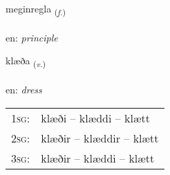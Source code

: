 \documentclass[frontgrid, backgrid]{flacards}\usepackage[]{graphicx}\usepackage[]{color}
\begin{document}
\renewcommand{\flhead}{\vskip5pt \fboxsep=0pt {\small\bfseries\footnotesize Nafnorð | Noun}}
\renewcommand{\fcfoot}{\vskip5pt \fboxsep=0pt \hspace{2pt}{\small\bfseries\footnotesize 2K}}

\renewcommand{\blhead}{\vskip5pt {\small\bfseries\footnotesize Nafnorð | Noun }}
\renewcommand{\bcfoot}{\vskip5pt \hspace{2pt}{\small\bfseries\footnotesize 2K}}


{meginregla \small{\textsubscript{(\textit{f.})}} \\[1ex] %
\textphonetic{[meijɪnrɛkla]} \\
en: \emph{principle} \\  [2ex]
\renewcommand*{\arraystretch}{0.8}
}

\renewcommand{\flhead}{\vskip5pt \fboxsep=0pt {\small\bfseries\footnotesize Sagnorð | Verb}}
\renewcommand{\fcfoot}{\vskip5pt \fboxsep=0pt \hspace{2pt}{\small\bfseries\footnotesize 2K}}

\renewcommand{\blhead}{\vskip5pt {\small\bfseries\footnotesize Sagnorð | Verb }}
\renewcommand{\bcfoot}{\vskip5pt \hspace{2pt}{\small\bfseries\footnotesize 2K}}


{klæða \small{\textsubscript{(\textit{v.})}} \\[1ex] %
\textphonetic{[kʰlaiːða]} \\
en: \emph{dress} \\  [2ex]
\renewcommand*{\arraystretch}{0.8}
\begin{tabular}{p{1cm}l}
\textsc{1sg}: & klæði -- klæddi -- klætt \\ 
\textsc{2sg}: & klæðir -- klæddir -- klætt \\ 
\textsc{3sg}: & klæðir -- klæddi -- klætt \\ 
\end{tabular}
}
\end{document}
